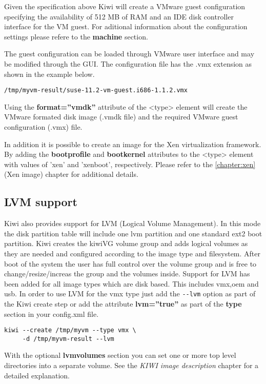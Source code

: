 Given the specification above Kiwi will create a VMware guest
configuration specifying the availability of 512 MB of RAM and an IDE 
disk controller interface for the VM guest. For aditional information
about the configuration settings please refere to the 
\textbf{machine} section. 

The guest configuration can be loaded through VMware user interface and 
may be modified through the GUI. The configuration file has the .vmx 
extension as shown in the example below.

\begin{Command}{13cm}
\begin{verbatim}
/tmp/myvm-result/suse-11.2-vm-guest.i686-1.1.2.vmx
\end{verbatim}
\end{Command}

Using the \textbf{format=''vmdk''} attribute of the <type> element
will create the VMware formated disk image (.vmdk file) and the required 
VMware guest configuration (.vmx) file.

In addition it is possible to create an image for the Xen virtualization 
framework.  By adding the \textbf{bootprofile} and \textbf{bootkernel} 
attributes to the <type> element with values of 'xen' and 'xenboot', 
respectively. Please refer to the \ref{chapter:xen} (Xen image) chapter 
for additional details.

\subsection{LVM support}

Kiwi also provides support for LVM (Logical Volume Management). In this
mode the disk partition table will include one lvm partition and one
standard ext2 boot partition. Kiwi creates the kiwiVG volume group and
adds logical volumes as they are needed and configured according to the
image type and filesystem. After boot of the system the user has full
control over the volume group and is free to change/resize/increas the
group and the volumes inside. Support for LVM has been added for all
image types which are disk based. This includes vmx,oem and usb.
In order to use LVM for the vmx type just add the \verb+--lvm+ option
as part of the Kiwi create step or add the attribute \textbf{lvm=''true''}
as part of the \textbf{type} section in your config.xml file.

\begin{Command}{12cm}
\begin{verbatim}
kiwi --create /tmp/myvm --type vmx \
     -d /tmp/myvm-result --lvm
\end{verbatim}
\end{Command}

With the optional \textbf{lvmvolumes} section you can set one or
more top level directories into a separate volume. See the
\textit{KIWI image description} chapter for a detailed explanation.
